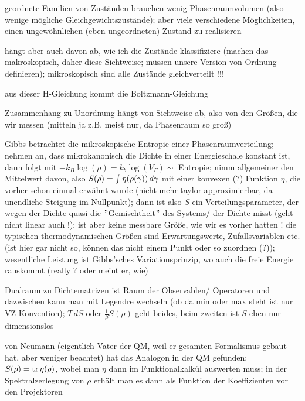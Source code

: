 geordnete Familien von Zuständen brauchen wenig Phasenraumvolumen (also wenige mögliche Gleichgewichtszustände); aber viele verschiedene Möglichkeiten, einen ungewöhnlichen (eben ungeordneten) Zustand zu realisieren

hängt aber auch davon ab, wie ich die Zustände klassifiziere (machen das makroskopisch, daher diese Sichtweise; müssen unsere Version von Ordnung definieren); mikroskopisch sind alle Zustände gleichverteilt !!!

aus dieser H-Gleichung kommt die Boltzmann-Gleichung


Zusammenhang zu Unordnung hängt von Sichtweise ab, also von den Größen, die wir messen (mitteln ja z.B. meist nur, da Phasenraum so groß)

Gibbs betrachtet die mikroskopische Entropie einer Phasenraumverteilung; nehmen an, dass mikrokanonisch die Dichte in einer Energieschale konstant ist, dann folgt mit $-k_B \log(\rho) = k_b \log(V_\Gamma) \sim$ Entropie; nimm allgemeiner den Mittelwert davon, also $S(\rho) = \int \eta\qty(\rho(\gamma)) \, d\gamma$ mit einer konvexen (?) Funktion $\eta$, die vorher schon einmal erwähnt wurde (nicht mehr taylor-approximierbar, da unendliche Steigung im Nullpunkt); dann ist also $S$ ein Verteilungsparameter, der wegen der Dichte quasi die $"$Gemischtheit$"$ des Systems/ der Dichte misst (geht nicht linear auch !); ist aber keine messbare Größe, wie wir es vorher hatten ! die typischen thermodynamischen Größen sind Erwartungswerte, Zufallsvariablen etc. (ist hier gar nicht so, können das nicht einem Punkt oder so zuordnen (?)); wesentliche Leistung ist Gibbs'sches Variationsprinzip, wo auch die freie Energie rauskommt (really ? oder meint er, wie)

Dualraum zu Dichtematrizen ist Raum der Observablen/ Operatoren und dazwischen kann man mit Legendre wechseln (ob da min oder max steht ist nur VZ-Konvention); $T \, dS$ oder $\frac{1}{\beta} S(\rho)$ geht beides, beim zweiten ist $S$ eben nur dimensionslos


von Neumann (eigentlich Vater der QM, weil er gesamten Formalismus gebaut hat, aber weniger beachtet) hat das Analogon in der QM gefunden: $S(\rho) = \tr \eta(\rho)$, wobei man $\eta$ dann im Funktionalkalkül auswerten muss; in der Spektralzerlegung von $\rho$ erhält man es dann als Funktion der Koeffizienten vor den Projektoren


